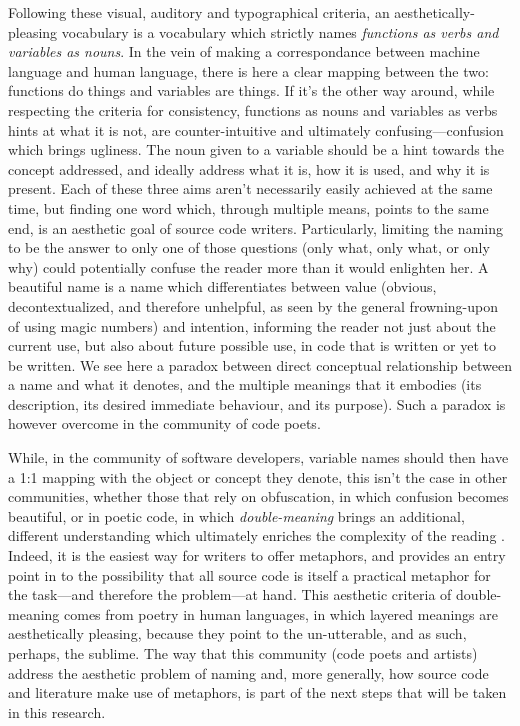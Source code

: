 Following these visual, auditory and typographical criteria, an aesthetically-pleasing vocabulary is a vocabulary which strictly names \emph{functions as verbs and variables as nouns}. In the vein of making a correspondance between machine language and human language, there is here a clear mapping between the two: functions do things and variables are things. If it's the other way around, while respecting the criteria for consistency, functions as nouns and variables as verbs hints at what it is not, are counter-intuitive and ultimately confusing—confusion which brings ugliness. The noun given to a variable should be a hint towards the concept addressed, and ideally address what it is, how it is used, and why it is present. Each of these three aims aren't necessarily easily achieved at the same time, but finding one word which, through multiple means, points to the same end, is an aesthetic goal of source code writers. Particularly, limiting the naming to be the answer to only one of those questions (only what, only what, or only why) could potentially confuse the reader more than it would enlighten her. A beautiful name is a name which differentiates between value (obvious, decontextualized, and therefore unhelpful, as seen by the general frowning-upon of using magic numbers) and intention, informing the reader not just about the current use, but also about future possible use, in code that is written or yet to be written. We see here a paradox between direct conceptual relationship between a name and what it denotes, and the multiple meanings that it embodies (its description, its desired immediate behaviour, and its purpose). Such a paradox is however overcome in the community of code poets.

While, in the community of software developers, variable names should then have a 1:1 mapping with the object or concept they denote, this isn't the case in other communities, whether those that rely on obfuscation, in which confusion becomes beautiful, or in poetic code, in which \emph{double-meaning} brings an additional, different understanding which ultimately enriches the complexity of the reading \citep{knuth_literate_1984}. Indeed, it is the easiest way for writers to offer metaphors, and provides an entry point in to the possibility that all source code is itself a practical metaphor for the task—and therefore the problem—at hand. This aesthetic criteria of double-meaning comes from poetry in human languages, in which layered meanings are aesthetically pleasing, because they point to the un-utterable, and as such, perhaps, the sublime. The way that this community (code poets and artists) address the aesthetic problem of naming and, more generally, how source code and literature make use of metaphors, is part of the next steps that will be taken in this research.

